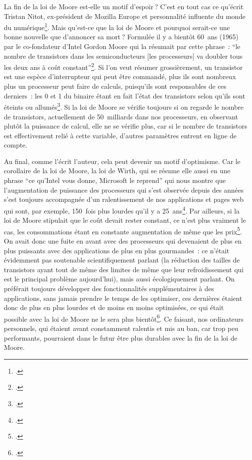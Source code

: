 La fin de la loi de Moore est-elle un motif d’espoir ? C’est en tout cas ce qu’écrit Tristan Nitot, ex-président de Mozilla Europe et personnalité influente du monde du numérique\footcite{nitot_loi_2024}. Mais qu’est-ce que la loi de Moore et pourquoi serait-ce une bonne nouvelle que d’annoncer sa mort ? Formulée il y a bientôt 60 ans (1965) par le co-fondateur d’Intel Gordon Moore qui la résumait par cette phrase : \enquote{le nombre de transistors dans les semiconducteurs [les processeurs] va doubler tous les deux ans à coût constant}\footcite{zotero-301}. Si l’on veut résumer grossièrement, un transistor est une espèce d’interrupteur qui peut être commandé, plus ils sont nombreux plus un processeur peut faire de calculs, puisqu’ils sont responsables de ces derniers : les 0 et 1 du binaire étant en fait l’état des transistors selon qu’ils sont éteints ou allumés\footcite{2024e}. Si la loi de Moore se vérifie toujours si on regarde le nombre de transistors, actuellement de 50 milliards dans nos processeurs, en observant plutôt la puissance de calcul, elle ne se vérifie plus, car si le nombre de transistors est effectivement relié à cette variable, d’autres paramètres entrent en ligne de compte.

Au final, comme l’écrit l’auteur, cela peut devenir un motif d’optimisme. Car le corollaire de la loi de Moore, la loi de Wirth, qui se résume elle aussi en une phrase \enquote{ce qu’Intel vous donne, Microsoft le reprend} qui nous montre que l’augmentation de puissance des processeurs qui s’est observée depuis des années s’est toujours accompagnée d’un ralentissement de nos applications et pages web qui sont, par exemple, 150 fois plus lourdes qu’il y a 25 ans\footcite[§ 8]{nitot_loi_2024}. Par ailleurs, si la loi de Moore stipulait que le coût devait rester constant, ce n’est plus vraiment le cas, les consommations étant en constante augmentation de même que les prix\footcite[§ 4- § 6]{nitot_loi_2024}. On avait donc une fuite en avant avec des processeurs qui devenaient de plus en plus puissants avec des applications de plus en plus gourmandes : ce n’était évidemment pas soutenable scientifiquement parlant (la réduction des tailles de transistors ayant tout de même des limites de même que leur refroidissement qui est le principal problème aujourd’hui), mais aussi écologiquement parlant. On préférait toujours développer des fonctionnalités supplémentaires à des applications, sans jamais prendre le temps de les optimiser, ces dernières étaient donc de plus en plus lourdes et de moins en moins optimisées, ce qui était possible avec la loi de Moore ne le sera plus bientôt\footcite[§ 9]{nitot_loi_2024}. Ce faisant, nos ordinateurs personnels, qui étaient avant constamment ralentis et mis au ban, car trop peu performants, pourraient dans le futur être plus durables avec la fin de la loi de Moore.

